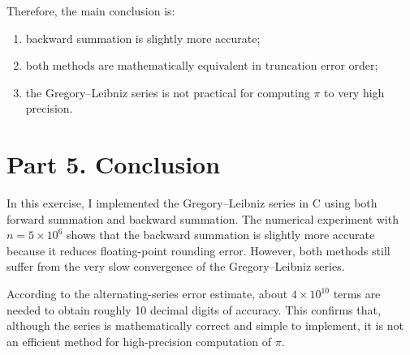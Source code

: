 \documentclass[12pt,a4paper]{article}
\begin{document}
Therefore, the main conclusion is:
\begin{enumerate}[label=(\arabic*)]
    \item backward summation is slightly more accurate;
    \item both methods are mathematically equivalent in truncation error order;
    \item the Gregory--Leibniz series is not practical for computing $\pi$ to very high precision.
\end{enumerate}

\section{Part 5. Conclusion}

In this exercise, I implemented the Gregory--Leibniz series in C using both forward summation and backward summation. The numerical experiment with $n=5\times 10^6$ shows that the backward summation is slightly more accurate because it reduces floating-point rounding error. However, both methods still suffer from the very slow convergence of the Gregory--Leibniz series.

According to the alternating-series error estimate, about $4\times 10^{10}$ terms are needed to obtain roughly 10 decimal digits of accuracy. This confirms that, although the series is mathematically correct and simple to implement, it is not an efficient method for high-precision computation of $\pi$.
\end{document}
